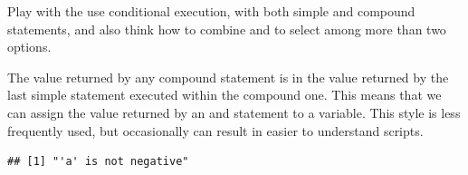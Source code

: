 \documentclass[krantz2]{krantz}\usepackage{knitr}%
\begin{document}
\begin{playground}
Play with the use conditional execution, with both simple and compound statements, and also think how to combine  and  to select among more than two options.
\end{playground}

The value returned by any compound statement is in \Rlang the value returned by the last simple statement executed within the compound one. This means that we can assign the value returned by an  and  statement to a variable. This style is less frequently used, but occasionally can result in easier to understand scripts.

\begin{knitrout}\footnotesize
{}\color{fgcolor}\begin{kframe}
\begin{alltt}
 \hlkwb{<-} 
 \hlkwb{<-}
    \hlopt{<} \hlstd{)}   
\end{alltt}
\begin{verbatim}
## [1] "'a' is not negative"
\end{verbatim}
\end{kframe}
\end{knitrout}
\end{document}
